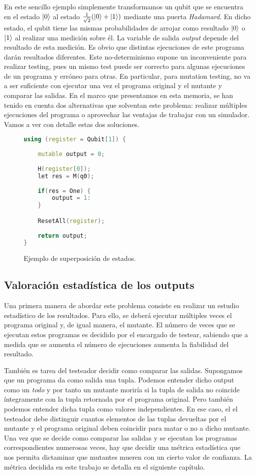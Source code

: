 En este sencillo ejemplo simplemente transformamos un qubit que se encuentra en el estado $\left|0\right\rangle$ al estado $\tfrac{1}{\sqrt{2}}(\left|0\right\rangle+\left|1\right\rangle)$ mediante una puerta \emph{Hadamard}. En dicho estado, el qubit tiene las mismas probabilidades de arrojar como resultado $\left|0\right\rangle$ o $\left|1\right\rangle$ al realizar una medición sobre él. La variable de salida \textit{output} depende del resultado de esta medición. Es obvio que distintas ejecuciones de este programa darán resultados diferentes. Este no-determinismo supone un inconveniente para realizar testing, pues un mismo test puede ser correcto para algunas ejecuciones de un programa y erróneo para otras. En particular, para mutation testing, no va a ser suficiente con ejecutar una vez el programa original y el mutante y comparar las salidas. En el marco que presentamos en esta memoria, se han tenido en cuenta dos alternativas que solventan este problema: realizar múltiples ejecuciones del programa o aprovechar las ventajas de trabajar con un simulador. Vamos a ver con detalle estas dos soluciones.
\begin{figure}[t]
\begin{lstlisting}[language=c++]
using (register = Qubit[1]) {
	
	mutable output = 0; 
	
	H(register[0]);
	let res = M(q0);
	
	if(res = One) {
		output = 1:
	}

	ResetAll(register);
	
	return output;
}
\end{lstlisting}
\caption{Ejemplo de superposición de estados.}
\label{fig:code43}
\end{figure}

\subsection{Valoración estadística de los outputs}

Una primera manera de abordar este problema consiste en realizar un estudio estadístico de los resultados. Para ello, se deberá ejecutar múltiples veces el programa original y, de igual manera, el mutante. El número de veces que se ejecutan estos programas es decidido por el encargado de testear, sabiendo que a medida que se aumenta el número de ejecuciones aumenta la fiabilidad del resultado. 

También es tarea del testeador decidir como comparar las salidas. Supongamos que un programa da como salida una tupla. Podemos entender dicho output como un {\it todo} y por tanto un mutante moriría si la tupla de salida no coincide íntegramente con la tupla retornada por el programa original. Pero también podemos entender dicha tupla como valores independientes. En ese caso, el el testeador debe distinguir cuantos elementos de las tuplas devueltas por el mutante y el programa original deben coincidir para matar o no a dicho mutante. Una vez que se decide como comparar las salidas y se ejecutan los programas correspondientes numerosas veces, hay que decidir una métrica estadística que nos permita dictaminar que mutantes mueren con un cierto valor de confianza. La métrica decidida en este trabajo se detalla en el siguiente capítulo.

